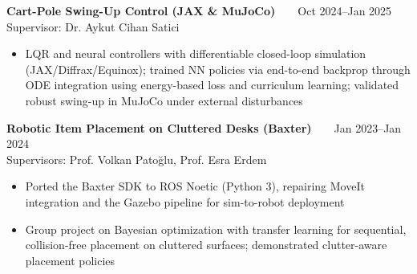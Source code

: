 \textbf{Cart-Pole Swing-Up Control (JAX \& MuJoCo)} \textbar\  \textbar\  \hfill Oct 2024--Jan 2025\\
Supervisor: Dr. Aykut Cihan Satici
\begin{itemize}
  \item LQR and neural controllers with differentiable closed-loop simulation (JAX/Diffrax/Equinox); trained NN policies via end-to-end backprop through ODE integration using energy-based loss and curriculum learning; validated robust swing-up in MuJoCo under external disturbances
\end{itemize}
\entrysep

\textbf{Robotic Item Placement on Cluttered Desks (Baxter)} \textbar\  \textbar\  \hfill Jan 2023--Jan 2024\\
Supervisors: Prof. Volkan Patoğlu, Prof. Esra Erdem
\begin{itemize}
  \item Ported the Baxter SDK to ROS Noetic (Python 3), repairing MoveIt integration and the Gazebo pipeline for sim-to-robot deployment
  \item Group project on Bayesian optimization with transfer learning for sequential, collision-free placement on cluttered surfaces; demonstrated clutter-aware placement policies
\end{itemize}
